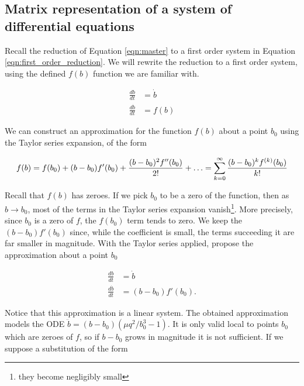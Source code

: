 \documentclass{article}
\begin{document}

\subsection{Matrix representation of a system of differential equations}

Recall the reduction of Equation \ref{eqn:master} to a first order system in Equation \ref{eqn:first_order_reduction}.
We will rewrite the reduction to a first order system, using the defined $f(b)$ function we are familiar with.

\begin{align}
    \frac{db}{dt} &= \dot{b} \\
    \frac{d\dot{b}}{dt} &= f(b)
    \label{eqn:first_order_modified}
\end{align}

We can construct an approximation for the function $f(b)$ about a point $b_0$ using the Taylor series expansion, of the form

\begin{equation}
    f(b) = f(b_0) + (b-b_0)f'(b_0) + \frac{(b-b_0)^2 f''(b_0)}{2!} + \mathellipsis = \sum_{k=0}^\infty\frac{(b-b_0)^{k}f^{(k)}(b_0)}{k!}
    \label{eqn:taylor_series}
\end{equation}

Recall that $f(b)$ has zeroes. If we pick $b_0$ to be a zero of the function, then as $b\rightarrow b_0$,
most of the terms in the Taylor series expansion vanish\footnote{they become negligibly small}.
More precisely, since $b_0$ is a zero of $f$, the $f(b_0)$ term tends to zero.
We keep the $(b-b_0)f'(b_0)$ since, while the coefficient is small,
the terms succeeding it are far smaller in magnitude.
With the Taylor series applied, propose the approximation about a point $b_0$

\begin{align}
    \frac{db}{dt} &= \dot{b} \\
    \frac{d\dot{b}}{dt} &= (b-b_0)f'(b_0).
    \label{eqn:first_order_approximated}
\end{align}

Notice that this approximation is a linear system. The obtained approximation models the ODE $\ddot{b} = (b-b_0)(\mu q^2/b_0^3-1)$.
It is only valid local to points $b_0$ which are zeroes of $f$, so if $b-b_0$ grows in magnitude it is not sufficient.
If we suppose a substitution of the form
\end{document}
